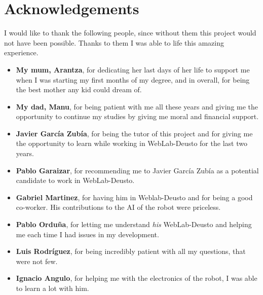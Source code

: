 \chapter*{Acknowledgements}

I would like to thank the following people, since without them this project would not have been
possible. Thanks to them I was able to life this amazing experience.

\begin{itemize}
	\item \textbf{My mum, Arantza}, for dedicating her last days of her life to support me when I
	was starting my first months of my degree, and in overall, for being the best mother any
	kid could dream of.

	\item \textbf{My dad, Manu}, for being patient with me all these years and giving me the
	opportunity to continue my studies by giving me moral and financial support.

	\item \textbf{Javier García Zubía}, for being the tutor of this project and for giving me the
	opportunity to learn while working in WebLab-Deusto for the last two years.

	\item \textbf{Pablo Garaizar}, for recommending me to Javier García Zubía as a
	potential candidate to work in WebLab-Deusto.

	\item \textbf{Gabriel Martinez}, for having him in Weblab-Deusto and for being a good co-worker.
	His contributions to the AI of the robot were priceless.

	\item \textbf{Pablo Orduña}, for letting me understand \textit{his} WebLab-Deusto and helping me
	each time I had issues in my development.

	\item \textbf{Luis Rodríguez}, for being incredibly patient with all my questions, that were not
	few.

	\item \textbf{Ignacio Angulo}, for helping me with the electronics of the robot, I was able to
	learn a lot with him.
\end{itemize}
